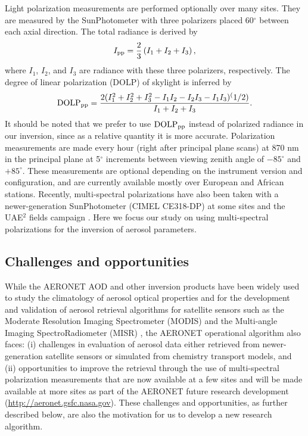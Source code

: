 Light polarization measurements are performed optionally over many sites. They
are measured by the SunPhotometer with three polarizers placed
60$^\circ$ between each axial direction. The total radiance is derived by 
\begin{equation}
I_\text{pp} = \frac{2}{3}\left( I_1+I_2+I_3 \right),
\end{equation}
where $I_1$, $I_2$, and $I_3$ are radiance with these three polarizers,
respectively. The degree of linear polarization (DOLP) of skylight is inferred
by
\begin{equation}
\text{DOLP}_\text{pp} = \frac{2(I_1^2+I_2^2+I_3^2-I_1I_2-I_2I_3-I_1I_3)^(1/2)}{I_1+I_2+I_3}.
\end{equation}
It should be noted that we prefer to use $\text{DOLP}_\text{pp}$ instead of polarized radiance
in our inversion, since as a relative quantity it is more accurate.
Polarization measurements are made every hour (right after principal plane
scans) at 870 nm in the principal plane at 5$^\circ$ increments between viewing zenith
angle of $-85^\circ$ and $+85^\circ$. These measurements are optional depending on the
instrument version and configuration, and are currently available mostly over
European and African stations. Recently, multi-spectral polarizations have also
been taken with a newer-generation SunPhotometer (CIMEL CE318-DP) at some sites
\citep{Li09} and the UAE$^2$ fields campaign \citep{Reid08}. Here we
focus our study on using multi-spectral polarizations for the inversion of
aerosol parameters.

\subsection{Challenges and opportunities}

While the AERONET AOD and other inversion products have been widely used to
study the climatology of aerosol optical properties \citep{Dubovik02b,Levy07a}
and for the development and validation of aerosol retrieval
algorithms for satellite sensors such as the Moderate Resolution Imaging
Spectrometer (MODIS) \citep{Kaufman97,Remer05,Levy07b,Levy10,Wang10}
and the Multi-angle Imaging SpectroRadiometer
(MISR) \citep{Diner98,Kahn10}, the AERONET operational
algorithm also faces: (i) challenges in evaluation of aerosol data either
retrieved from newer-generation satellite sensors or simulated from chemistry
transport models, and (ii) opportunities to improve the retrieval through the
use of multi-spectral polarization measurements that are now available at a few
sites and will be made available at more sites as part of the AERONET future
research development (\url{http://aeronet.gsfc.nasa.gov}). These challenges and
opportunities, as further described below, are also the motivation for us to
develop a new research algorithm.

